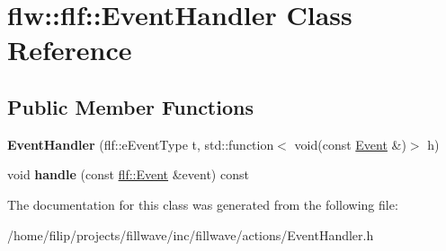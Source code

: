 \hypertarget{classflw_1_1flf_1_1EventHandler}{}\section{flw\+:\+:flf\+:\+:Event\+Handler Class Reference}
\label{classflw_1_1flf_1_1EventHandler}
\subsection*{Public Member Functions}
\begin{DoxyCompactItemize}
\item 
\mbox{\label{classflw_1_1flf_1_1EventHandler_aea0936eef7cbe8ed3f0e1faaca63a4b3}} 
{\bfseries Event\+Handler} (flf\+::e\+Event\+Type t, std\+::function$<$ void(const \hyperlink{classflw_1_1flf_1_1Event}{Event} \&)$>$ h)
\item 
\mbox{\label{classflw_1_1flf_1_1EventHandler_a182adba5776e37d6d3829cab9a1415ee}} 
void {\bfseries handle} (const \hyperlink{classflw_1_1flf_1_1Event}{flf\+::\+Event} \&event) const
\end{DoxyCompactItemize}


The documentation for this class was generated from the following file\+:\begin{DoxyCompactItemize}
\item 
/home/filip/projects/fillwave/inc/fillwave/actions/Event\+Handler.\+h\end{DoxyCompactItemize}
